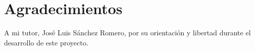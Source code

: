 \chapter*{Agradecimientos}


A mi tutor, José Luis Sánchez Romero, por su orientación y libertad durante el desarrollo de este proyecto.

